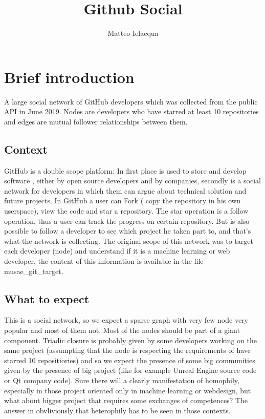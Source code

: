 \documentclass[]{article}
\begin{document}
\author{Matteo Ielacqua}
\title{Github Social}
\maketitle
    \section{Brief introduction}
    A large social network of GitHub developers which was collected from the public API in June 2019. Nodes are developers who have starred at least 10 repositories and edges are mutual follower relationships between them.
    \subsection*{Context}
    GitHub is a double scope platform: In first place is used to store and develop software , either by open source developers and by companies, secondly is a social network for developers in which them can argue about technical solution and future projects. In GitHub a user can Fork ( copy the repository in his own userspace), view the code and star a repository. The star operation is a follow operation, thus a user can track the progress on certain repository. But is also possible to follow a developer to see which project he taken part to, and that's what the network is collecting. The original scope of this network was to target each developer (node) and understand if it is a machine learning or web developer, the content of this information is available in the file musae_git_target.
    \subsection*{What to expect}
    This is a social network, so we expect a sparse graph with very few node very popular and most of them not. Most of the nodes should be part of a giant component. Triadic closure is probably given by some developers working on the same project (assumpting that the node is respecting the requirements of have starred 10 repositiories) and so we expect the presence of some big communities given by the presence of big project (like for example Unreal Engine source code or Qt company code). Sure there will a clearly manifestation of homophily, especially in those project oriented only in machine learning or webdesign, but what about bigger project that requires some exchanges of competences? The answer in obvliviously that heterophily has to be seen in those contexts. 
\end{document}
